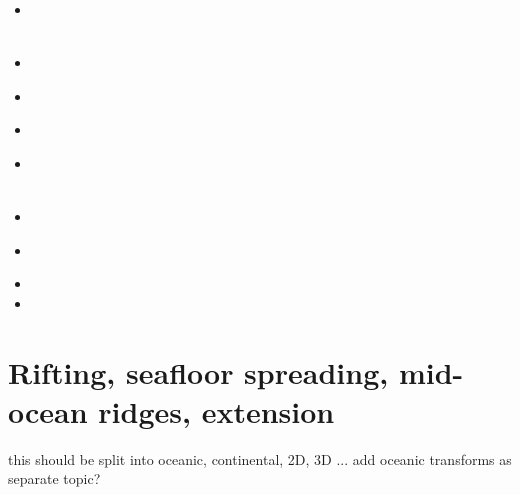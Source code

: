 \begin{small}
\begin{itemize}
\item[\twothousandthirteen] 
 \\
 \\
\item[\twothousandfourteen] 
\item[\twothousandfifteen] 
 \\
\item[\twothousandseventeen] 
\item[\twothousandnineteen] 
 \\
 \\
\item[\twothousandtwenty] 
\item[\twothousandtwentyone] 
 \\
\item[\twothousandtwentytwo] 
\item[\twothousandtwentythree] 
\end{itemize}
\end{small}










\section{Rifting, seafloor spreading, mid-ocean ridges, extension}

{\color{red} this should be split into oceanic, continental, 2D, 3D ...}
add oceanic transforms as separate topic?

